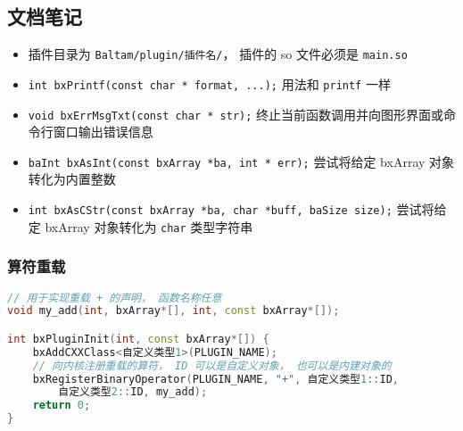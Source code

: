 \subsection{文档笔记}
\begin{itemize}
\item 插件目录为 \verb|Baltam/plugin/插件名/|， 插件的 so 文件必须是 \verb|main.so|
\item \verb|int bxPrintf(const char * format, ...);| 用法和 \verb|printf| 一样
\item \verb|void bxErrMsgTxt(const char * str);| 终止当前函数调用并向图形界面或命令行窗口输出错误信息
\item \verb|baInt bxAsInt(const bxArray *ba, int * err);| 尝试将给定 bxArray 对象转化为内置整数
\item \verb|int bxAsCStr(const bxArray *ba, char *buff, baSize size);| 尝试将给定 bxArray 对象转化为 \verb`char` 类型字符串
\end{itemize}

\subsubsection{算符重载}
\begin{lstlisting}[language=cpp]
// 用于实现重载 + 的声明， 函数名称任意
void my_add(int, bxArray*[], int, const bxArray*[]);

int bxPluginInit(int, const bxArray*[]) {
    bxAddCXXClass<自定义类型1>(PLUGIN_NAME);
    // 向内核注册重载的算符， ID 可以是自定义对象， 也可以是内建对象的
    bxRegisterBinaryOperator(PLUGIN_NAME, "+", 自定义类型1::ID,
        自定义类型2::ID, my_add);
    return 0;
}
\end{lstlisting}
